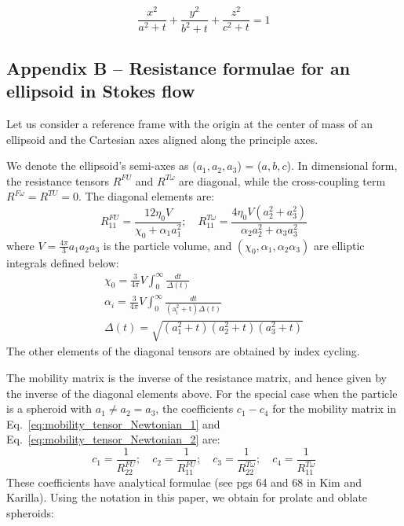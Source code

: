 \documentclass{jfm}
\begin{document}
\begin{equation}
    \frac{x^2}{a^2 + t} + \frac{y^2}{b^2 + t}  + \frac{z^2}{c^2 + t} = 1
\end{equation}



\subsection{Appendix B -- Resistance formulae for an ellipsoid in Stokes flow}

Let us consider a reference frame with the origin at the center of mass of an ellipsoid and the Cartesian axes aligned along the principle axes.

We denote the ellipsoid’s semi-axes as ($a_1,a_2,a_3$) = ($a,b,c$).  In dimensional form, the resistance tensors $R^{FU}$ and $R^{T\omega}$ are diagonal, while the cross-coupling term $R^{F\omega}=R^{TU}=0$.  The diagonal elements are:
\begin{equation}
R_{11}^{F U}=\frac{12 \eta_0 V}{\chi_0+\alpha_1 a_1^2} ; \quad R_{11}^{T \omega}=\frac{4 \eta_0 V\left(a_2^2+a_3^2\right)}{\alpha_2 a_2^2+\alpha_3 a_3^2}
\end{equation}
where $V=\frac{4 \pi}{3} a_1 a_2 a_3$ is the particle volume, and $\left(\chi_0, \alpha_1, \alpha_2 \alpha_3\right)$ are elliptic integrals defined below:
$$
\begin{gathered}
\chi_0=\frac{3}{4 \pi} V \int_0^{\infty} \frac{d t}{\Delta(t)} \\
\alpha_i=\frac{3}{4 \pi} V \int_0^{\infty} \frac{d t}{\left(\mathrm{a}_{\mathrm{i}}^2+\mathrm{t}\right) \Delta(t)} \\
\Delta(t)=\sqrt{\left(a_1^2+t\right)\left(a_2^2+t\right)\left(a_3^2+t\right)}
\end{gathered}
$$
The other elements of the diagonal tensors are obtained by index cycling.

The mobility matrix is the inverse of the resistance matrix, and hence given by the inverse of the diagonal elements above. For the special case when the particle is a spheroid with $a_1 \neq a_2=a_3$, the coefficients $c_1-c_4$ for the mobility matrix in Eq.~\eqref{eq:mobility_tensor_Newtonian_1} and Eq.~\eqref{eq:mobility_tensor_Newtonian_2} are:
$$
c_1=\frac{1}{R_{22}^{F U}} ; \quad c_2=\frac{1}{R_{11}^{F U}} ; \quad c_3=\frac{1}{R_{22}^{T \omega}} ; \quad c_4=\frac{1}{R_{11}^{T \omega}}
$$
These coefficients have analytical formulae (see pgs 64 and 68 in Kim and Karilla).  Using the notation in this paper, we obtain for prolate and oblate spheroids:\\
\end{document}
